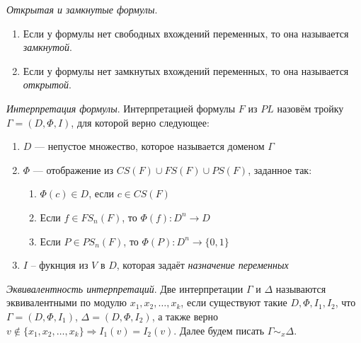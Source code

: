 \begin{definition}
  \emph{Открытая и замкнутые формулы}.
    \begin{enumerate}
      \item Если у формулы нет свободных вхождений переменных, то она называется \textit{замкнутой}.
      \item Если у формулы нет замкнутых вхождений переменных, то она называется \textit{открытой}.
    \end{enumerate}
\end{definition}

\begin{definition}
  \emph{Интерпретация формулы}. Интерпретацией формулы $F$ из $PL$ назовём тройку $\Gamma = (D, \Phi, I)$, для которой верно следующее:
    \begin{enumerate}
		\item $D$ --- непустое множество, которое называется доменом $\Gamma$
        \item $\Phi$ --- отображение из $CS(F) \cup FS(F) \cup PS(F)$, заданное так:
          \begin{enumerate}
              \item $\Phi(c) \in D$, если $c \in CS(F)$
              \item Если $f \in FS_n(F)$, то $\Phi(f) : D^n \rightarrow D$
              \item Если $P \in PS_n(F)$, то $\Phi(P) : D^n \rightarrow \{ 0, 1 \}$
          \end{enumerate}
        \item $I$ -- фукнция из $V$ в $D$, которая задаёт \textit{назначение переменных}
    \end{enumerate}

\end{definition}


\begin{definition}
  \emph{Эквивалентность интерпретаций}. Две интерпретации $\Gamma$ и $\Delta$ называются эквивалентными по модулю $x_1, x_2, \ldots, x_k$, если существуют такие $D, \Phi, I_1, I_2$, что $\Gamma = {(D, \Phi, I_1)}$, $\Delta = {(D, \Phi, I_2)}$, а также верно $v \notin \{x_1, x_2, \ldots, x_k\} \Rightarrow I_1(v) = I_2(v)$. Далее будем писать $\Gamma \sim_x \Delta$.
\end{definition}

